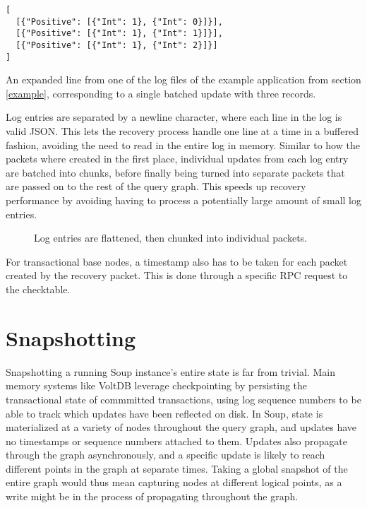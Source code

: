 \documentclass[b5paper]{report}
\begin{document}
\begin{listing}[H]
  \begin{verbatim}
[
  [{"Positive": [{"Int": 1}, {"Int": 0}]}],
  [{"Positive": [{"Int": 1}, {"Int": 1}]}],
  [{"Positive": [{"Int": 1}, {"Int": 2}]}]
]
  \end{verbatim}
  \caption{
    An expanded line from one of the log files of the example application from section
    \ref{example}, corresponding to a single batched update with three records.
    \label{lst:log-entry}
  }
\end{listing}

Log entries are separated by a newline character, where each line in the log
is valid JSON. This lets the recovery process handle one line at a time in a
buffered fashion, avoiding the need to read in the entire log in memory. Similar
to how the packets where created in the first place, individual updates from
each log entry are batched into chunks, before finally being turned into
separate packets that are passed on to the rest of the query graph. This speeds
up recovery performance by avoiding having to process a potentially large
amount of small log entries.

\begin{figure}
  \caption{
    Log entries are flattened, then chunked into individual packets.
    \label{log-chunking}
  }
\end{figure}

For transactional base nodes, a timestamp also has to be taken for each packet
created by the recovery packet. This is done through a specific RPC request to the
checktable.

\section{Snapshotting}
Snapshotting a running Soup instance's entire state is far from trivial.
Main memory systems like VoltDB leverage checkpointing by persisting the
transactional state of commmitted transactions, using log sequence numbers to be
able to track which updates have been reflected on disk. In Soup, state is
materialized at a variety of nodes throughout the query graph, and updates have no
timestamps or sequence numbers attached to them. Updates also propagate through
the graph asynchronously, and a specific update is likely to reach different
points in the graph at separate times. Taking a global snapshot of the entire
graph would thus mean capturing nodes at different logical points, as a write
might be in the process of propagating throughout the graph.
\end{document}
